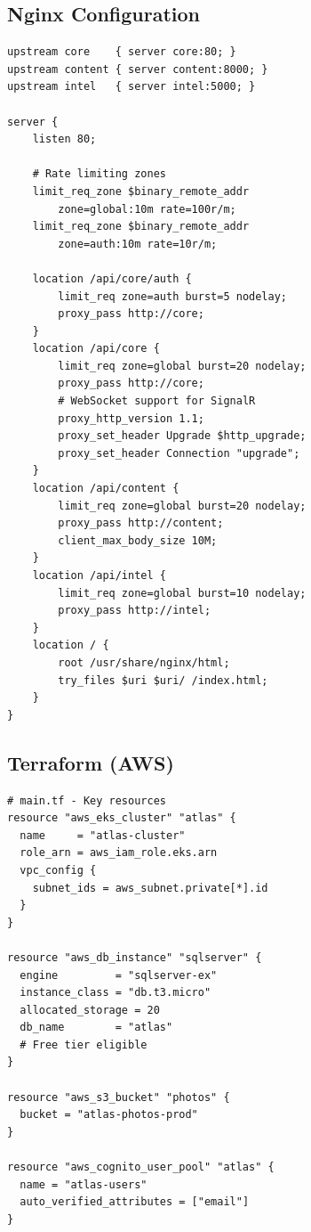 \documentclass[12pt,letterpaper]{article}
\begin{document}
\subsection{Nginx Configuration}
\begin{lstlisting}[style=code]
upstream core    { server core:80; }
upstream content { server content:8000; }
upstream intel   { server intel:5000; }

server {
    listen 80;

    # Rate limiting zones
    limit_req_zone $binary_remote_addr
        zone=global:10m rate=100r/m;
    limit_req_zone $binary_remote_addr
        zone=auth:10m rate=10r/m;

    location /api/core/auth {
        limit_req zone=auth burst=5 nodelay;
        proxy_pass http://core;
    }
    location /api/core {
        limit_req zone=global burst=20 nodelay;
        proxy_pass http://core;
        # WebSocket support for SignalR
        proxy_http_version 1.1;
        proxy_set_header Upgrade $http_upgrade;
        proxy_set_header Connection "upgrade";
    }
    location /api/content {
        limit_req zone=global burst=20 nodelay;
        proxy_pass http://content;
        client_max_body_size 10M;
    }
    location /api/intel {
        limit_req zone=global burst=10 nodelay;
        proxy_pass http://intel;
    }
    location / {
        root /usr/share/nginx/html;
        try_files $uri $uri/ /index.html;
    }
}
\end{lstlisting}

\subsection{Terraform (AWS)}
\begin{lstlisting}[style=code]
# main.tf - Key resources
resource "aws_eks_cluster" "atlas" {
  name     = "atlas-cluster"
  role_arn = aws_iam_role.eks.arn
  vpc_config {
    subnet_ids = aws_subnet.private[*].id
  }
}

resource "aws_db_instance" "sqlserver" {
  engine         = "sqlserver-ex"
  instance_class = "db.t3.micro"
  allocated_storage = 20
  db_name        = "atlas"
  # Free tier eligible
}

resource "aws_s3_bucket" "photos" {
  bucket = "atlas-photos-prod"
}

resource "aws_cognito_user_pool" "atlas" {
  name = "atlas-users"
  auto_verified_attributes = ["email"]
}
\end{lstlisting}
\end{document}
